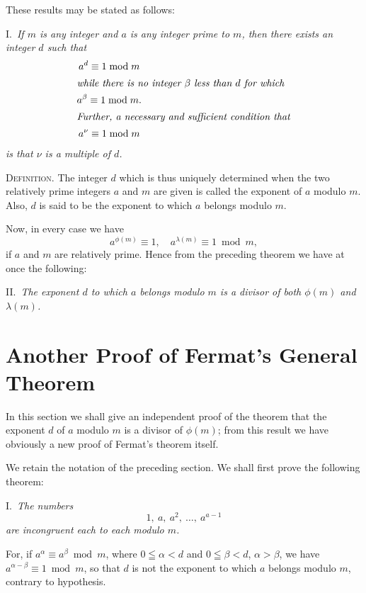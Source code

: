 \documentclass[oneside]{book}
\begin{document}
\smallskip These results may be stated as follows:

\smallskip I.~\emph{If $m$ is any integer and $a$ is any integer
prime to $m$, then there exists an integer $d$ such that}
\begin{gather*}
a^d\equiv 1 \bmod m \\
\intertext{\emph{while there is no integer $\beta$ less than $d$ for
which}}
a^\beta\equiv 1 \bmod m. \\
\intertext{\emph{Further, a necessary and sufficient condition
that}}
a^\nu \equiv 1 \bmod m
\end{gather*}
\emph{is that $\nu$ is a multiple of $d$.}

\smallskip \textsc{Definition.} The integer $d$ which is thus
uniquely determined when the two relatively prime integers $a$ and
$m$ are given is called the exponent of $a$ modulo $m$. Also, $d$ is
said to be the exponent to which $a$ belongs modulo $m$.

Now, in every case we have
\begin{equation*}
a^{\phi(m)} \equiv 1,\quad a^{\lambda(m)} \equiv 1 \bmod m,
\end{equation*}
if $a$ and $m$ are relatively prime. Hence from the preceding
theorem we have at once the following:

\smallskip II.~\textit{The exponent $d$ to which $a$ belongs modulo
$m$ is a divisor of both $\phi(m)$ and $\lambda(m)$.}%

\section{Another Proof of Fermat's General Theorem}\label{s33}

In this section we shall give an independent proof of the theorem
that the exponent $d$ of $a$ modulo $m$ is a divisor of $\phi(m)$;
from this result we have obviously a new proof of Fermat's theorem
itself.

We retain the notation of the preceding section. We shall first
prove the following theorem:

\smallskip I.~\textit{The numbers}
\begin{equation}
1,\ a,\ a^2,\ \ldots,\ a^{a-1} \tag{A}
\end{equation}
\textit{are incongruent each to each modulo $m$.}

For, if $a^\alpha \equiv a^\beta \bmod m$, where $0 \leqq \alpha <
d$ and $0 \leqq \beta < d$, $\alpha > \beta$, we have
$a^{\alpha-\beta} \equiv 1 \bmod m$, so that $d$ is not the exponent
to which $a$ belongs modulo $m$, contrary to hypothesis.
\end{document}
